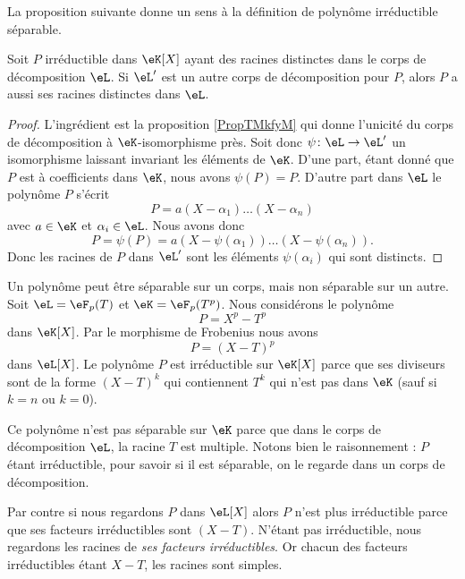 La proposition suivante donne un sens à la définition de polynôme irréductible séparable.
\begin{proposition}
    Soit \( P\) irréductible dans \( \eK[X]\) ayant des racines distinctes dans le corps de décomposition \( \eL\). Si \( \eL'\) est un autre corps de décomposition pour \( P\), alors \( P\) a aussi ses racines distinctes dans \( \eL\).
\end{proposition}

\begin{proof}
    L'ingrédient est la proposition \ref{PropTMkfyM} qui donne l'unicité du corps de décomposition à \( \eK\)-isomorphisme près. Soit donc \( \psi\colon \eL\to \eL'\) un isomorphisme laissant invariant les éléments de \( \eK\). D'une part, étant donné que \( P\) est à coefficients dans \( \eK\), nous avons \( \psi(P)=P\). D'autre part dans \( \eL\) le polynôme \( P\) s'écrit
    \begin{equation}
        P=a(X-\alpha_1)\ldots (X-\alpha_n)
    \end{equation}
    avec \( a\in \eK\) et \( \alpha_i\in \eL\). Nous avons donc
    \begin{equation}
        P=\psi(P)=a(X-\psi(\alpha_1))\ldots (X-\psi(\alpha_n)).
    \end{equation}
    Donc les racines de \( P\) dans \( \eL'\) sont les éléments \( \psi(\alpha_i)\) qui sont distincts.
\end{proof}

\begin{example}
    Un polynôme peut être séparable sur un corps, mais non séparable sur un autre. Soit \( \eL=\eF_p(T)\) et \( \eK=\eF_p(T^p)\). Nous considérons le polynôme
    \begin{equation}
        P=X^p-T^p
    \end{equation}
    dans \( \eK[X]\). Par le morphisme de Frobenius nous avons 
    \begin{equation}
        P=(X-T)^p
    \end{equation}
    dans \( \eL[X]\). Le polynôme \( P\) est irréductible sur \( \eK[X]\) parce que ses diviseurs sont de la forme \( (X-T)^k\) qui contiennent \( T^k\) qui n'est pas dans \( \eK\) (sauf si \( k=n\) ou \( k=0\)).

    Ce polynôme n'est pas séparable sur \( \eK\) parce que dans le corps de décomposition \( \eL\), la racine \( T\) est multiple. Notons bien le raisonnement : \( P\) étant irréductible, pour savoir si il est séparable, on le regarde dans un corps de décomposition.

    Par contre si nous regardons \( P\) dans \( \eL[X]\) alors \( P\) n'est plus irréductible parce que ses facteurs irréductibles sont \( (X-T)\). N'étant pas irréductible, nous regardons les racines de \emph{ses facteurs irréductibles}. Or chacun des facteurs irréductibles étant \( X-T\), les racines sont simples.
\end{example}

